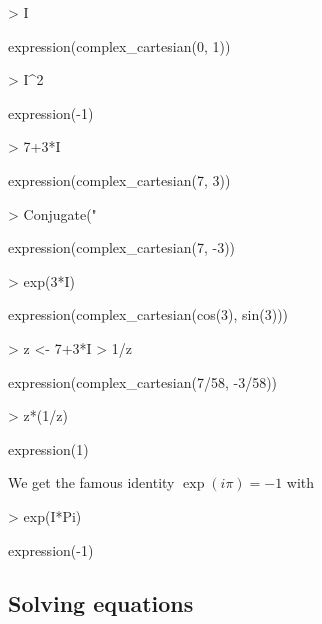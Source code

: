 \documentclass[10pt]{article}
\begin{document}
\begin{Schunk}
\begin{Sinput}
> I
\end{Sinput}
\begin{Soutput}
expression(complex_cartesian(0, 1))
\end{Soutput}
\begin{Sinput}
> I^2
\end{Sinput}
\begin{Soutput}
expression(-1)
\end{Soutput}
\begin{Sinput}
> 7+3*I
\end{Sinput}
\begin{Soutput}
expression(complex_cartesian(7, 3))
\end{Soutput}
\begin{Sinput}
> Conjugate("%")
\end{Sinput}
\begin{Soutput}
expression(complex_cartesian(7, -3))
\end{Soutput}
\begin{Sinput}
> exp(3*I)
\end{Sinput}
\begin{Soutput}
expression(complex_cartesian(cos(3), sin(3)))
\end{Soutput}
\end{Schunk}

\begin{Schunk}
\begin{Sinput}
> z <- 7+3*I
> 1/z
\end{Sinput}
\begin{Soutput}
expression(complex_cartesian(7/58, -3/58))
\end{Soutput}
\begin{Sinput}
> z*(1/z)
\end{Sinput}
\begin{Soutput}
expression(1)
\end{Soutput}
\end{Schunk}

We get the famous identity $\exp(i\pi)=-1$ with
\begin{Schunk}
\begin{Sinput}
> exp(I*Pi)
\end{Sinput}
\begin{Soutput}
expression(-1)
\end{Soutput}
\end{Schunk}

\subsection{Solving equations}
\end{document}
